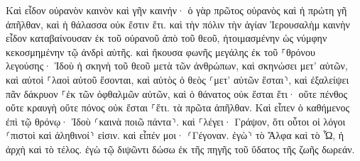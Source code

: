 \documentclass{openreader}
\begin{document}
Καὶ εἶδον οὐρανὸν καινὸν καὶ γῆν καινήν· ὁ γὰρ πρῶτος οὐρανὸς καὶ ἡ πρώτη γῆ ἀπῆλθαν, καὶ ἡ θάλασσα οὐκ ἔστιν ἔτι. 
καὶ τὴν πόλιν τὴν ἁγίαν Ἰερουσαλὴμ καινὴν εἶδον καταβαίνουσαν ἐκ τοῦ οὐρανοῦ ἀπὸ τοῦ θεοῦ, ἡτοιμασμένην ὡς νύμφην κεκοσμημένην τῷ ἀνδρὶ αὐτῆς. 
καὶ ἤκουσα φωνῆς μεγάλης ἐκ τοῦ ⸀θρόνου λεγούσης· Ἰδοὺ ἡ σκηνὴ τοῦ θεοῦ μετὰ τῶν ἀνθρώπων, καὶ σκηνώσει μετ’ αὐτῶν, καὶ αὐτοὶ ⸀λαοὶ αὐτοῦ ἔσονται, καὶ αὐτὸς ὁ θεὸς ⸂μετ’ αὐτῶν ἔσται⸃, 
καὶ ἐξαλείψει πᾶν δάκρυον ⸀ἐκ τῶν ὀφθαλμῶν αὐτῶν, καὶ ὁ θάνατος οὐκ ἔσται ἔτι· οὔτε πένθος οὔτε κραυγὴ οὔτε πόνος οὐκ ἔσται ⸀ἔτι. τὰ πρῶτα ἀπῆλθαν. 
Καὶ εἶπεν ὁ καθήμενος ἐπὶ τῷ θρόνῳ· Ἰδοὺ ⸂καινὰ ποιῶ πάντα⸃. καὶ ⸀λέγει· Γράψον, ὅτι οὗτοι οἱ λόγοι ⸂πιστοὶ καὶ ἀληθινοί⸃ εἰσιν. 
καὶ εἶπέν μοι· ⸂Γέγοναν. ἐγὼ⸃ τὸ Ἄλφα καὶ τὸ Ὦ, ἡ ἀρχὴ καὶ τὸ τέλος. ἐγὼ τῷ διψῶντι δώσω ἐκ τῆς πηγῆς τοῦ ὕδατος τῆς ζωῆς δωρεάν. 
\end{document}
